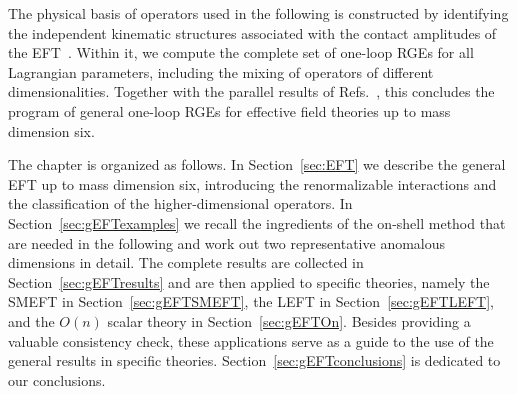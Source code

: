 The physical basis of operators used in the following is constructed by identifying the independent
kinematic structures associated with the contact amplitudes of the
EFT~\cite{Shadmi:2018xan,Cheung:2016drk,Falkowski:2019zdo,Durieux:2019siw,Li:2022tec,DeAngelis:2022qco,Durieux:2019eor}. Within it, we compute the complete set of one-loop RGEs for all
Lagrangian parameters, including the mixing of operators of different dimensionalities. Together with
the parallel results of Refs.~\cite{Fonseca:2025zjb,Misiak:2025xzq,Fonseca:2025cls}, this concludes the program of
general one-loop RGEs for effective field theories up to mass dimension six.

The chapter is organized as follows. In Section~\ref{sec:EFT} we describe the general EFT up to mass
dimension six, introducing the renormalizable interactions and the classification of the
higher-dimensional operators. In Section~\ref{sec:gEFTexamples} we recall the ingredients of the
on-shell method that are needed in the following and work out two representative anomalous dimensions
in detail. The complete results are collected in Section~\ref{sec:gEFTresults} and are then applied to
specific theories, namely the SMEFT in Section~\ref{sec:gEFTSMEFT}, the LEFT in
Section~\ref{sec:gEFTLEFT}, and the $O(n)$ scalar theory in Section~\ref{sec:gEFTOn}. Besides
providing a valuable consistency check, these applications serve as a guide to the use of the general
results in specific theories. Section~\ref{sec:gEFTconclusions} is dedicated to our conclusions.


